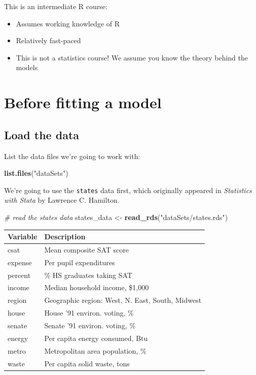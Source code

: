 \documentclass[]{book}
\newenvironment{Shaded}{\begin{snugshade}}{\end{snugshade}}
\newcommand{\KeywordTok}[1]{\textcolor[rgb]{0.13,0.29,0.53}{\textbf{#1}}}
\newcommand{\StringTok}[1]{\textcolor[rgb]{0.31,0.60,0.02}{#1}}
\newcommand{\CommentTok}[1]{\textcolor[rgb]{0.56,0.35,0.01}{\textit{#1}}}
\newcommand{\NormalTok}[1]{#1}
\providecommand{\tightlist}{%
  \setlength{\itemsep}{0pt}\setlength{\parskip}{0pt}}
\begin{document}
This is an intermediate R course:

\begin{itemize}
\tightlist
\item
  Assumes working knowledge of R
\item
  Relatively fast-paced
\item
  This is not a statistics course! We assume you know the theory behind
  the models
\end{itemize}

\section{Before fitting a model}\label{before-fitting-a-model}

\subsection{Load the data}\label{load-the-data}

List the data files we're going to work with:

\begin{Shaded}
\begin{Highlighting}[]
\KeywordTok{list.files}\NormalTok{(}\StringTok{"dataSets"}\NormalTok{)}
\end{Highlighting}
\end{Shaded}

We're going to use the \texttt{states} data first, which originally
appeared in \emph{Statistics with Stata} by Lawrence C. Hamilton.

\begin{Shaded}
\begin{Highlighting}[]
  \CommentTok{# read the states data}
\NormalTok{  states_data <-}\StringTok{ }\KeywordTok{read_rds}\NormalTok{(}\StringTok{"dataSets/states.rds"}\NormalTok{) }
\end{Highlighting}
\end{Shaded}

\begin{longtable}[]{@{}ll@{}}
\toprule
Variable & Description\tabularnewline
\midrule
\endhead
csat & Mean composite SAT score\tabularnewline
expense & Per pupil expenditures\tabularnewline
percent & \% HS graduates taking SAT\tabularnewline
income & Median household income, \$1,000\tabularnewline
region & Geographic region: West, N. East, South, Midwest\tabularnewline
house & House '91 environ. voting, \%\tabularnewline
senate & Senate '91 environ. voting, \%\tabularnewline
energy & Per capita energy consumed, Btu\tabularnewline
metro & Metropolitan area population, \%\tabularnewline
waste & Per capita solid waste, tons\tabularnewline
\bottomrule
\end{longtable}
\end{document}
